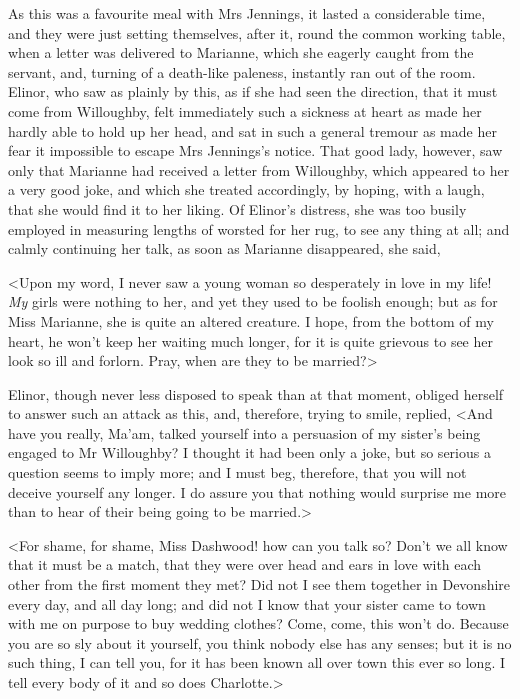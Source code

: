 As this was a favourite meal with Mrs Jennings, it lasted a considerable time, and they were just setting themselves, after it, round the common working table, when a letter was delivered to Marianne, which she eagerly caught from the servant, and, turning of a death-like paleness, instantly ran out of the room. Elinor, who saw as plainly by this, as if she had seen the direction, that it must come from Willoughby, felt immediately such a sickness at heart as made her hardly able to hold up her head, and sat in such a general tremour as made her fear it impossible to escape Mrs Jennings's notice. That good lady, however, saw only that Marianne had received a letter from Willoughby, which appeared to her a very good joke, and which she treated accordingly, by hoping, with a laugh, that she would find it to her liking. Of Elinor's distress, she was too busily employed in measuring lengths of worsted for her rug, to see any thing at all; and calmly continuing her talk, as soon as Marianne disappeared, she said,

<Upon my word, I never saw a young woman so desperately in love in my life! \textit{My} girls were nothing to her, and yet they used to be foolish enough; but as for Miss Marianne, she is quite an altered creature. I hope, from the bottom of my heart, he won't keep her waiting much longer, for it is quite grievous to see her look so ill and forlorn. Pray, when are they to be married?>

Elinor, though never less disposed to speak than at that moment, obliged herself to answer such an attack as this, and, therefore, trying to smile, replied, <And have you really, Ma'am, talked yourself into a persuasion of my sister's being engaged to Mr Willoughby? I thought it had been only a joke, but so serious a question seems to imply more; and I must beg, therefore, that you will not deceive yourself any longer. I do assure you that nothing would surprise me more than to hear of their being going to be married.>

<For shame, for shame, Miss Dashwood! how can you talk so? Don't we all know that it must be a match, that they were over head and ears in love with each other from the first moment they met? Did not I see them together in Devonshire every day, and all day long; and did not I know that your sister came to town with me on purpose to buy wedding clothes? Come, come, this won't do. Because you are so sly about it yourself, you think nobody else has any senses; but it is no such thing, I can tell you, for it has been known all over town this ever so long. I tell every body of it and so does Charlotte.>

